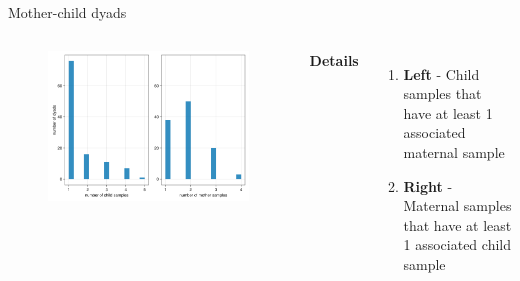 
\begin{frame}{Mother-child dyads}
    \begin{columns}[c] %

    
        \begin{figure}
        \includegraphics[width=1\linewidth]{../figures/dyads.png}
        \end{figure}

    
        \textbf{Details}
        \begin{enumerate}
            \item \textbf{Left} - Child samples that have at least 1 associated maternal sample
            \item \textbf{Right} - Maternal samples that have at least 1 associated child sample
        \end{enumerate}

    \end{columns}

\end{frame}


